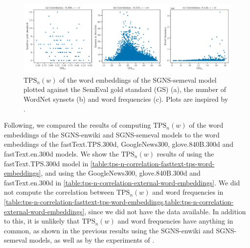 \begin{figure}[H]
    \centering
    \includegraphics[width=\textwidth]{thesis/figures/tps-n-correlation-sgns-semeval_2010_task_14.pdf}
    \caption{$\text{TPS}_n(w)$ of the word embeddings of the SGNS-semeval model plotted against the SemEval gold standard (GS) (a), the number of WordNet synsets (b) and word frequencies (c). Plots are inspired by \cite[Figures 8 and 9]{jakubowski2020topology}.}
    \label{fig:tps-n-correlation-sgns-semeval}
\end{figure}

Following, we compared the results of computing $\text{TPS}_n(w)$ of the word embeddings of the SGNS-enwiki and SGNS-semeval models to the word embeddings of the fastText.TPS.300d, GoogleNews300, glove.840B.300d and fastText.en.300d models. We show the $\text{TPS}_n(w)$ results of using the fastText.TPS.300d model in \cref{table:tps-n-correlation-fasttext-tps-word-embeddings}, and using the GoogleNews300, glove.840B.300d and fastText.en.300d in \cref{table:tps-n-correlation-external-word-embeddings}. We did not compute the correlation between $\text{TPS}_n(w)$ and word frequencies in \cref{table:tps-n-correlation-fasttext-tps-word-embeddings,table:tps-n-correlation-external-word-embeddings}, since we did not have the data available. In addition to this, it is unlikely that $\text{TPS}_n(w)$ and word frequencies have anything in common, as shown in the previous results using the SGNS-enwiki and SGNS-semeval models, as well as by the experiments of \cite{jakubowski2020topology}.


